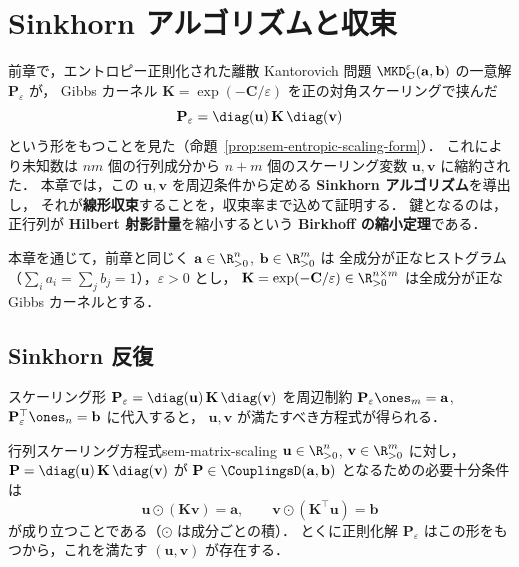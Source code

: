 \chapter{Sinkhorn アルゴリズムと収束}
\label{ch:seminar-04-sinkhorn}

前章で，エントロピー正則化された離散 Kantorovich 問題
$\MKD_{\mathbf{C}}^\varepsilon(\mathbf{a}, \mathbf{b})$ の一意解 $\mathbf{P}_\varepsilon$ が，
Gibbs カーネル $\mathbf{K} = \exp(-\mathbf{C}/\varepsilon)$ を正の対角スケーリングで挟んだ
\[
  \mathbf{P}_\varepsilon = \diag(\mathbf{u})\,\mathbf{K}\,\diag(\mathbf{v})
\]
という形をもつことを見た（命題~\ref{prop:sem-entropic-scaling-form}）．
これにより未知数は $nm$ 個の行列成分から $n+m$ 個のスケーリング変数 $\mathbf{u}, \mathbf{v}$ に縮約された．
本章では，この $\mathbf{u}, \mathbf{v}$ を周辺条件から定める \textbf{Sinkhorn アルゴリズム}を導出し，
それが\textbf{線形収束}することを，収束率まで込めて証明する．
鍵となるのは，正行列が \textbf{Hilbert 射影計量}を縮小するという
\textbf{Birkhoff の縮小定理}である．

本章を通じて，前章と同じく $\mathbf{a} \in \R_{>0}^n$, $\mathbf{b} \in \R_{>0}^m$ は
全成分が正なヒストグラム（$\sum_i a_i = \sum_j b_j = 1$），$\varepsilon > 0$ とし，
$\mathbf{K} = \exp(-\mathbf{C}/\varepsilon) \in \R_{>0}^{n\times m}$ は全成分が正な Gibbs カーネルとする．

\section{Sinkhorn 反復}
\label{sec:sem-sinkhorn-iteration}

スケーリング形 $\mathbf{P}_\varepsilon = \diag(\mathbf{u})\,\mathbf{K}\,\diag(\mathbf{v})$ を周辺制約
$\mathbf{P}_\varepsilon\ones_m = \mathbf{a}$, $\mathbf{P}_\varepsilon^\top\ones_n = \mathbf{b}$ に代入すると，
$\mathbf{u}, \mathbf{v}$ が満たすべき方程式が得られる．

\begin{proposition}{行列スケーリング方程式}{sem-matrix-scaling}
  $\mathbf{u} \in \R_{>0}^n$, $\mathbf{v} \in \R_{>0}^m$ に対し，
  $\mathbf{P} = \diag(\mathbf{u})\,\mathbf{K}\,\diag(\mathbf{v})$ が
  $\mathbf{P} \in \CouplingsD(\mathbf{a}, \mathbf{b})$ となるための必要十分条件は
  \[
    \mathbf{u} \odot (\mathbf{K}\mathbf{v}) = \mathbf{a},
    \qquad
    \mathbf{v} \odot (\mathbf{K}^\top\mathbf{u}) = \mathbf{b}
  \]
  が成り立つことである（$\odot$ は成分ごとの積）．
  とくに正則化解 $\mathbf{P}_\varepsilon$ はこの形をもつから，これを満たす
  $(\mathbf{u}, \mathbf{v})$ が存在する．
\end{proposition}

